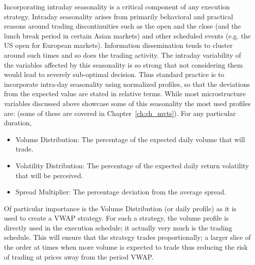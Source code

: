 Incorporating intraday seasonality is a critical component of any execution strategy. Intraday seasonality arises from primarily behavioral and practical reasons around trading discontinuities such as the open and the close (and the lunch break period in certain Asian markets) and other scheduled events (e.g. the US open for European markets). Information dissemination tends to cluster around such times and so does the trading activity. The intraday variability of the variables affected by this seasonality is so strong that not considering them would lead to severely sub-optimal decision. Thus standard practice is to incorporate intra-day seasonality using normalized profiles, so that the deviations from the expected value are stated in relative terms. While most microstructure variables discussed above showcase some of this seasonality the most used profiles are: (some of these are covered in Chapter~\ref{ch:ch_mvts}). For any particular duration,
\begin{itemize}
	\item Volume Distribution: The percentage of the expected daily volume that will trade.
	\item Volatility Distribution: The percentage of the expected daily return volatility that will  be perceived.
	\item Spread Multiplier: The percentage deviation from the average spread.
\end{itemize}
Of particular importance is the Volume Distribution (or daily profile) as it is used to create a VWAP strategy. For such a strategy, the volume profile is directly used in the execution schedule; it actually very much is the trading schedule. This will ensure that the strategy trades proportionally; a larger slice of the order at times when more volume is expected to trade thus reducing the risk of trading at prices away from the period VWAP.


